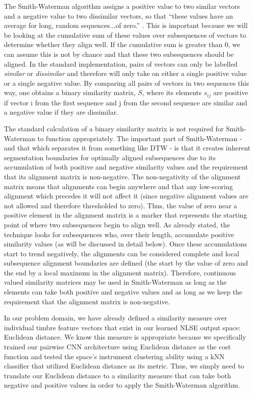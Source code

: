 \documentclass[a4paper,12pt]{report} 	%
\numberwithin{figure}{chapter}
\numberwithin{table}{chapter}
\numberwithin{equation}{chapter}
\begin{document}
\begin{flushleft}
The Smith-Waterman algorithm assigns a positive value to two similar vectors and a negative value to two dissimilar vectors, so that ``these values have an average for long, random sequences...of zero.'' \cite[p. 196]{smith1981textordfeminineidentification}. This is important because we will be looking at the cumulative sum of these values over subsequences of vectors to determine whether they align well. If the cumulative sum is greater than $0$, we can assume this is not by chance and that these two subsequences should be aligned. In the standard implementation, pairs of vectors can only be labelled \emph{similar} or \emph{dissimilar} and therefore will only take on either a single positive value or a single negative value. By comparing all pairs of vectors in two sequences this way, one obtains a binary similarity matrix, $S$, where its elements $s_{ij}$ are positive if vector i from the first sequence and j from the second sequence are similar and a negative value if they are dissimilar.

The standard calculation of a binary similarity matrix is not required for Smith-Waterman to function appropriately. The important part of Smith-Waterman - and that which separates it from something like DTW - is that it creates inherent segmentation boundaries for optimally aligned subsequences due to its accumulation of both positive and negative similarity values and the requirement that its alignment matrix is non-negative. The non-negativity of the alignment matrix means that alignments can begin anywhere and that any low-scoring alignment which precedes it will not affect it (since negative alignment values are not allowed and therefore thresholded to zero). Thus, the value of zero near a positive element in the alignment matrix is a marker that represents the starting point of where two subsequences begin to align well. As already stated, the technique looks for subsequences who, over their length, accumulate positive similarity values (as will be discussed in detail below). Once these accumulations start to trend negatively, the alignments can be considered complete and local subsequence alignment boundaries are defined (the start by the value of zero and the end by a local maximum in the alignment matrix). Therefore, continuous valued similarity matrices may be used in Smith-Waterman as long as the elements can take both positive and negative values and as long as we keep the requirement that the alignment matrix is non-negative.

In our problem domain, we have already defined a similarity measure over individual timbre feature vectors that exist in our learned NLSE output space: Euclidean distance. We know this measure is appropriate because we specifically trained our pairwise CNN architecture using Euclidean distance as the cost function and tested the space's instrument clustering ability using a kNN classifier that utilized Euclidean distance as its metric. Thus, we simply need to translate our Euclidean distance to a similarity measure that can take both negative and positive values in order to apply the Smith-Waterman algorithm. 


\end{flushleft}
\end{document}
